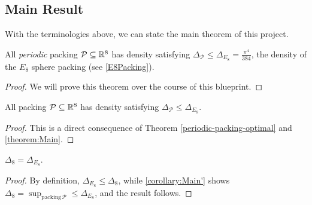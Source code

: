 \subsection{Main Result}

With the terminologies above, we can state the main theorem of this project.

\begin{theorem}\label{theorem:Main}
  All \emph{periodic} packing $\mathcal{P} \subseteq \mathbb{R}^8$ has density satisfying $\Delta_{\mathcal{P}} \leq \Delta_{E_8} = \frac{\pi^4}{384}$, the density of the $E_8$ sphere packing (see \cref{E8Packing}).
\end{theorem}
\begin{proof}
  We will prove this theorem over the course of this blueprint.
\end{proof}

\begin{corollary}\label{corollary:Main'}
  All packing $\mathcal{P} \subseteq \mathbb{R}^8$ has density satisfying $\Delta_{\mathcal{P}} \leq \Delta_{E_8}$.
\end{corollary}
\begin{proof}
  This is a direct consequence of Theorem \cref{periodic-packing-optimal} and \cref{theorem:Main}.
\end{proof}

\begin{corollary}\label{corollary:Main''}
  $\Delta_8 = \Delta_{E_8}$.
\end{corollary}
\begin{proof}
  By definition, $\Delta_{E_8} \leq \Delta_8$, while \cref{corollary:Main'} shows $\Delta_8 = \sup_{\mathrm{packing} \, \mathcal{P}} \leq \Delta_{E_8}$, and the result follows.
\end{proof}

